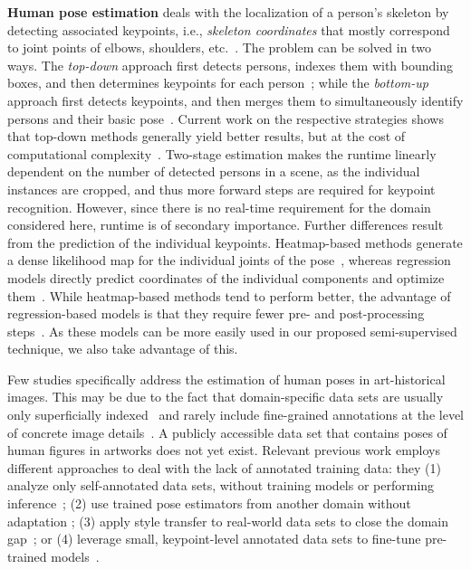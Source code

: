 \documentclass[sigconf]{acmart}
\begin{document}
\textbf{Human pose estimation} deals with the localization of a person's skeleton by detecting associated keypoints, i.e., \textit{skeleton coordinates} that mostly correspond to joint points of elbows, shoulders, etc.~\cite{DBLP:conf/cvpr/0012WZXXT21, DBLP:conf/cvpr/0009XLW19, DBLP:conf/cvpr/KreissBA19,  DBLP:conf/cvpr/ChengXWSH020, DBLP:journals/pami/CaoHSWS21, DBLP:conf/eccv/XiaoWW18, DBLP:conf/cvpr/ZhangZD0Z20}.
The problem can be solved in two ways. The \textit{top-down} approach first detects persons, indexes them with bounding boxes, and then determines keypoints for each person~\cite{DBLP:conf/cvpr/0012WZXXT21, DBLP:conf/cvpr/0009XLW19, DBLP:conf/cvpr/KreissBA19}; while the \textit{bottom-up} approach first detects keypoints, and then merges them to simultaneously identify persons and their basic pose~\cite{DBLP:journals/pami/CaoHSWS21, DBLP:conf/cvpr/ChengXWSH020, DBLP:conf/eccv/PapandreouZCGTM18}. 
Current work on the respective strategies shows that top-down methods generally yield better results, but at the cost of computational complexity~\cite{DBLP:conf/cvpr/ChengXWSH020}. 
Two-stage estimation makes the runtime linearly dependent on the number of detected persons in a scene, as the individual instances are cropped, and thus more forward steps are required for keypoint recognition. 
However, since there is no real-time requirement for the domain considered here, runtime is of secondary importance. Further differences result from the prediction of the individual keypoints.
Heatmap-based methods generate a dense likelihood map for the individual joints of the pose~\cite{DBLP:conf/cvpr/0009XLW19}, whereas regression models directly predict coordinates of the individual components and optimize them~\cite{DBLP:conf/cvpr/0012WZXXT21}. 
While heatmap-based methods tend to perform better, the advantage of regression-based models is that they require fewer pre- and post-processing steps~\cite{DBLP:conf/cvpr/0012WZXXT21}. 
As these models can be more easily used in our proposed semi-supervised technique, we also take advantage of this.

Few studies specifically address the estimation of human poses in art-historical images. This may be due to the fact that domain-specific data sets are usually only superficially indexed~\cite{painter, artigo, DBLP:conf/bmvc/KarayevTHADHW14} and rarely include fine-grained annotations at the level of concrete image details~\cite{DBLP:conf/eccv/GarciaV18,DBLP:conf/mm/MaoCS17, DBLP:journals/corr/abs-1906-00901, DBLP:journals/tomccap/StrezoskiW18}. 
A publicly accessible data set that contains poses of human figures in artworks does not yet exist. 
Relevant previous work employs different approaches to deal with the lack of annotated training data: they (1) analyze only self-annotated data sets, without training models or performing inference~\cite{DBLP:conf/eccv/ImpettS16}; 
(2) use trained pose estimators from another domain without adaptation \cite{DBLP:conf/eccv/MadhuMKBMC20, DBLP:conf/icdar/JenicekC19}; 
(3) apply style transfer to real-world data sets to close the domain gap~\cite{DBLP:journals/corr/abs-2012-05616}; 
or (4) leverage small, keypoint-level annotated data sets to fine-tune pre-trained models~\cite{DBLP:journals/corr/abs-2012-05616}.
\end{document}
